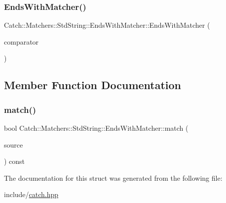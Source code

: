 \subsubsection{\texorpdfstring{EndsWithMatcher()}{EndsWithMatcher()}}
{\footnotesize\ttfamily Catch\+::\+Matchers\+::\+Std\+String\+::\+Ends\+With\+Matcher\+::\+Ends\+With\+Matcher (\begin{DoxyParamCaption}\item[{\mbox{\hyperlink{struct_catch_1_1_matchers_1_1_std_string_1_1_cased_string}{Cased\+String}} const \&}]{comparator }\end{DoxyParamCaption})}



\subsection{Member Function Documentation}
\mbox{\label{struct_catch_1_1_matchers_1_1_std_string_1_1_ends_with_matcher_aca2741fa57374a2a98d2a84ac3e13a6d}} 
\subsubsection{\texorpdfstring{match()}{match()}}
{\footnotesize\ttfamily bool Catch\+::\+Matchers\+::\+Std\+String\+::\+Ends\+With\+Matcher\+::match (\begin{DoxyParamCaption}\item[{std\+::string const \&}]{source }\end{DoxyParamCaption}) const\hspace{0.3cm}{\ttfamily [override]}}



The documentation for this struct was generated from the following file\+:\begin{DoxyCompactItemize}
\item 
include/\mbox{\hyperlink{catch_8hpp}{catch.\+hpp}}\end{DoxyCompactItemize}
